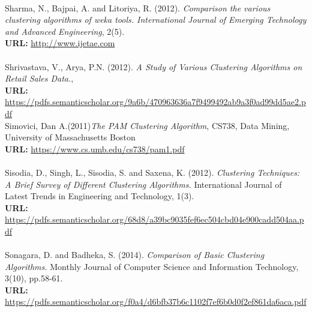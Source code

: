 \documentclass[a4paper,12pt,fleqn]{article}
\begin{document}
\\
Sharma, N., Bajpai, A. and Litoriya, R. (2012). \textit{Comparison the various clustering algorithms of weka tools. International Journal of Emerging Technology and Advanced Engineering}, 2(5).\\ \textbf{URL:} \url{http://www.ijetae.com}\\
\\
Shrivastava, V., Arya, P.N. (2012). \textit{A Study of Various Clustering Algorithms on Retail Sales Data.}, \\
\textbf{URL:} \url{https://pdfs.semanticscholar.org/9a6b/470963636a7f9499492ab9a3f0ad99dd5ae2.pdf}
\\
Simovici, Dan A.(2011)\textit{The PAM Clustering Algorithm}, CS738, Data Mining, University of Massachusetts Boston\\
\textbf{URL:} \url{https://www.cs.umb.edu/cs738/pam1.pdf}\\
\\
Sisodia, D., Singh, L., Sisodia, S. and Saxena, K. (2012). \textit{Clustering Techniques: A Brief Survey of Different Clustering Algorithms.} International Journal of Latest Trends in Engineering and Technology, 1(3).\\
\textbf{URL:} \url{https://pdfs.semanticscholar.org/68d8/a39bc9035fef6ec504cbd04e900cadd504aa.pdf}\\
\\
Sonagara, D. and Badheka, S. (2014). \textit{Comparison of Basic Clustering Algorithms.} Monthly Journal of Computer Science and Information Technology, 3(10), pp.58-61.\\
\textbf{URL:} \url{https://pdfs.semanticscholar.org/f0a4/d6bfb37b6c1102f7ef6b0d0f2ef861da6aca.pdf}\\
\end{document}
